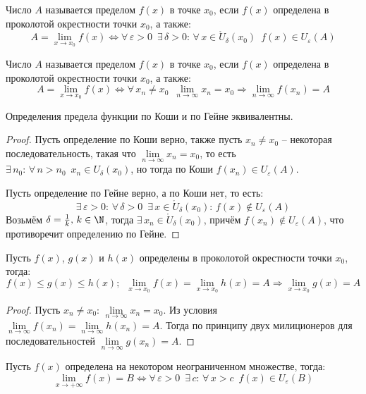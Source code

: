 \documentclass[12pt]{article}
\begin{document}
\begin{definition}
    Число $A$ называется пределом $f(x)$ в точке $x_0$, если $f(x)$ определена в проколотой окрестности точки $x_0$, а также:
    $$A=\lim_{x\to x_0}f(x)\Longleftrightarrow\forall\,\varepsilon>0\enspace \exists\,\delta>0:\, \forall\,x\in \mathring{U}_\delta(x_0)\enspace f(x)\in U_\varepsilon(A)$$
\end{definition}
\begin{definition}
    Число $A$ называется пределом $f(x)$ в точке $x_0$, если $f(x)$ определена в проколотой окрестности точки $x_0$, а также:
    $$A=\lim_{x\to x_0}f(x)\Longleftrightarrow\forall\,x_n\neq x_0\enspace \lim_{n\to\infty}x_n=x_0\Longrightarrow \lim_{n\to\infty}f(x_n)=A$$
\end{definition}
\begin{statement}
    Определения предела функции по Коши и по Гейне эквивалентны.
\end{statement}
\begin{proof}
    Пусть определение по Коши верно, также пусть $x_n\neq x_0$ -- некоторая последовательность, такая что $\lim\limits_{n\to\infty}x_n=x_0$, то есть $\exists\,n_0:\,\forall\,n>n_0\enspace x_n\in U_\delta(x_0)$, но тогда по Коши $f(x_n)\in U_\varepsilon(A)$.\bigskip

    Пусть определение по Гейне верно, а по Коши нет, то есть:
    $$\exists\,\varepsilon>0:\,\forall\,\delta>0\enspace\exists\,x\in\mathring{U}_\delta(x_0):\,f(x)\notin U_\varepsilon(A)$$
    Возьмём $\delta=\frac{1}{k},\,k\in\N$, тогда $\exists\,x_n\in\mathring{U}_\delta(x_0)$, причём $f(x_n)\notin U_\varepsilon(A)$, что противоречит определению по Гейне.
\end{proof}
\begin{theorem}
    Пусть $f(x)$, $g(x)$ и $h(x)$ определены в проколотой окрестности точки $x_0$, тогда:
    $$f(x)\leq g(x)\leq h(x);\enspace \lim_{x\to x_0}f(x)=\lim_{x\to x_0}h(x)=A\Longrightarrow \lim_{x\to x_0}g(x)=A$$
\end{theorem}
\begin{proof}
    Пусть $x_n\neq x_0:\,\lim\limits_{n\to\infty}x_n=x_0$. Из условия $\lim\limits_{n\to\infty}f(x_n)=\lim\limits_{n\to\infty}h(x_n)=A$. Тогда по принципу двух милиционеров для последовательностей $\lim\limits_{n\to\infty}g(x_n)=A$.
\end{proof}
\begin{definition}
    Пусть $f(x)$ определена на некотором неограниченном множестве, тогда:
    $$\lim_{x\to+\infty}f(x)=B\Longleftrightarrow \forall\,\varepsilon>0\enspace\exists\,c:\,\forall\,x>c\enspace f(x)\in U_\varepsilon(B)$$
\end{definition}
\end{document}
